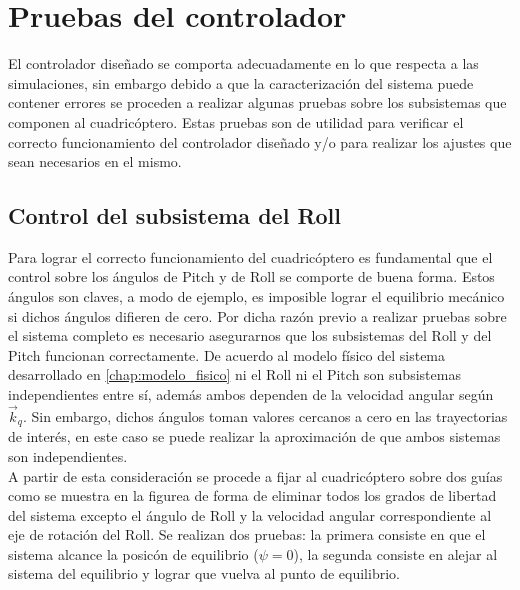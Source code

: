 \documentclass[main]{subfiles}
\begin{document}
\chapter{Pruebas del controlador}
El controlador diseñado se comporta adecuadamente en lo que respecta a las simulaciones, sin embargo debido a que la caracterizaci\'on del sistema puede contener errores se proceden a realizar algunas pruebas sobre los subsistemas que componen al cuadric\'optero. Estas pruebas son de utilidad para verificar el correcto funcionamiento del controlador diseñado y/o para realizar los ajustes que sean necesarios en el mismo.\\

\section{Control del subsistema del Roll}

Para lograr el correcto funcionamiento del cuadric\'optero es fundamental que el control sobre los \'angulos de Pitch y de Roll se comporte de buena forma. Estos \'angulos son claves, a modo de ejemplo, es imposible lograr el equilibrio mec\'anico si dichos \'angulos difieren de cero. Por dicha raz\'on previo a realizar pruebas sobre el sistema completo es necesario asegurarnos que los subsistemas del  Roll y del Pitch funcionan correctamente. De acuerdo al modelo f\'isico del sistema desarrollado en \ref{chap:modelo_fisico} ni el Roll ni el Pitch son subsistemas independientes entre s\'i, adem\'as ambos dependen de la velocidad angular seg\'un $\vec{k}_q$. Sin embargo, dichos \'angulos toman valores cercanos a cero en las trayectorias de inter\'es, en este caso se puede realizar la aproximaci\'on de que ambos sistemas son independientes.\\

A partir de esta consideraci\'on se procede a fijar al cuadric\'optero sobre dos gu\'ias como se muestra en la figurea de forma de eliminar todos los grados de libertad del sistema excepto el \'angulo de Roll y la velocidad angular correspondiente al eje de rotaci\'on del Roll. Se realizan dos pruebas: la primera consiste en que el sistema alcance la posic\'on de equilibrio ($\psi = 0$), la segunda consiste en alejar al sistema del equilibrio y lograr que vuelva al punto de equilibrio.
\end{document}
